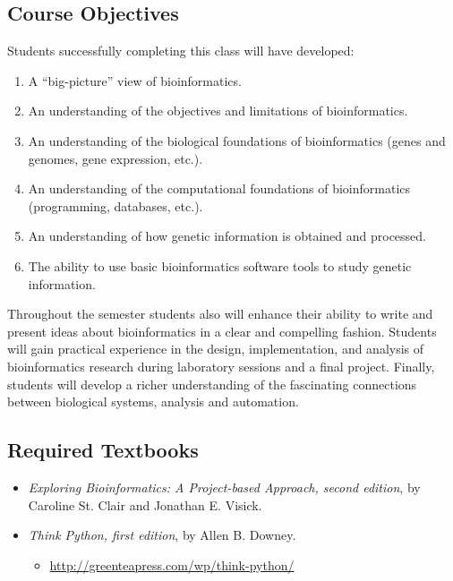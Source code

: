 \documentclass[11pt]{article} %
\begin{document}
\subsection*{\textbf{Course Objectives}}

Students successfully completing this class will have developed:
\begin{enumerate}
  \item A “big-picture” view of bioinformatics.
  \item An understanding of the objectives and limitations of bioinformatics.
  \item An understanding of the biological foundations of bioinformatics (genes and genomes, gene expression, etc.).
  \item An understanding of the computational foundations of bioinformatics (programming, databases, etc.).
  \item An understanding of how genetic information is obtained and processed.
  \item The ability to use basic bioinformatics software tools to study genetic information.
\end{enumerate}

\noindent Throughout the semester students also will enhance their ability to write and present ideas about bioinformatics in a clear and compelling fashion. Students will gain practical experience in the design, implementation, and analysis of bioinformatics research during laboratory sessions and a final project. Finally, students will develop a richer understanding of the fascinating connections between biological systems, analysis and automation.


\subsection*{\textbf{Required Textbooks}}
\begin{itemize}

\item \emph{Exploring Bioinformatics: A Project-based Approach, second edition}, by Caroline St. Clair and
Jonathan E. Visick.

\item \emph{Think Python, first edition}, by Allen B. Downey.
	\begin{itemize}
		\item \url{http://greenteapress.com/wp/think-python/}
	\end{itemize}

\end{itemize}
\end{document}
